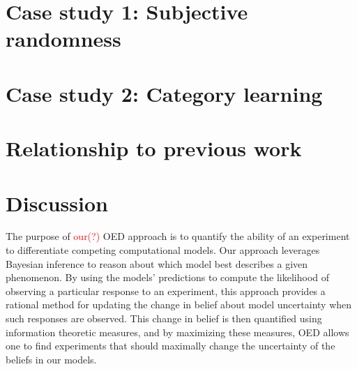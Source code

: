 \documentclass{article}
\newcommand{\red}[1]{\textcolor{Red}{#1}}
\begin{document}
\section{Case study 1: Subjective randomness}
\section{Case study 2: Category learning}
\section{Relationship to previous work}
\section{Discussion}

The purpose of \red{our(?)} OED approach is to quantify the ability of an experiment to differentiate competing computational models. Our approach leverages Bayesian inference to reason about which model best describes a given phenomenon. By using the models' predictions to compute the likelihood of observing a particular response to an experiment, this approach provides a rational method for updating the change in belief about model uncertainty when such responses are observed. This change in belief is then quantified using information theoretic measures, and by maximizing these measures, OED allows one to find experiments that should maximally change the uncertainty of the beliefs in our models. 
\end{document}
